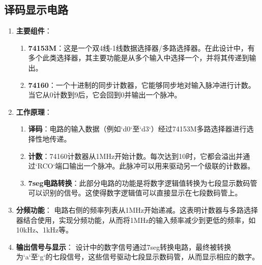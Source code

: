 \documentclass[UTF8,titlepage,a4paper]{ctexart}
\numberwithin{figure}{section}
\begin{document}
\subsection{译码显示电路}


\begin{enumerate}
    \item \textbf{主要组件}：
    \begin{enumerate}
        \item \textbf{74153M}：这是一个双4线-1线数据选择器/多路选择器。在此设计中，有多个此类选择器，其主要功能是从多个输入中选择一个，并将其传递到输出。
        
        \item \textbf{74160}：一个十进制的同步计数器，它能够同步地对输入脉冲进行计数。当它从0计数到9后，它会回到0并输出一个脉冲。
    \end{enumerate}

    \item \textbf{工作原理}：
    \begin{enumerate}
        \item \textbf{译码}：电路的输入数据（例如`d0`至`d3`）经过74153M多路选择器进行选择性地传递。
        
        \item \textbf{计数}：74160计数器从1MHz开始计数。每次达到10时，它都会溢出并通过`RCO`端口输出一个脉冲。此脉冲可以用来驱动另一个级联的计数器。
        
        \item \textbf{7seg电路转换}：此部分电路的功能是将数字逻辑值转换为七段显示数码管可以识别的信号。这使得数字逻辑值可以直接显示在七段数码管上。
    \end{enumerate}

    \item \textbf{分频功能}：
        电路右侧的频率列表从1MHz开始递减。这表明计数器与多路选择器结合使用，实现分频功能，从而将1MHz的输入频率减少到更低的频率，如10kHz、1kHz等。
    
    \item \textbf{输出信号与显示}：
     设计中的数字信号通过7seg转换电路，最终被转换为`a`至`g`的七段信号，这些信号驱动七段显示数码管，从而显示相应的数字。


\end{enumerate}
\end{document}
